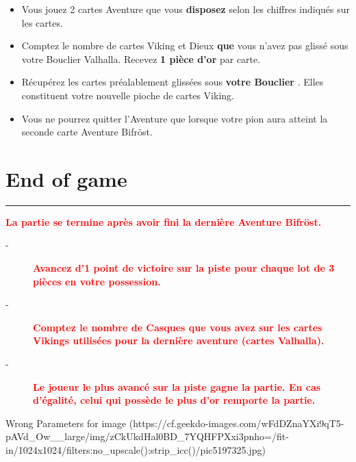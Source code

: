\documentclass{scrartcl}%
\begin{document}
\begin{itemize}%
\item%
%
 Vous jouez 2 cartes Aventure que vous %
\textcolor{mygreen}{%
\textbf{disposez}%
}%
\textit{ }%
 selon les chiffres indiqués sur les cartes.
%
\item%
%
 Comptez le nombre de cartes Viking et Dieux %
\textcolor{mygreen}{%
\textbf{que}%
}%
\textit{ }%
 vous n'avez pas glissé sous votre Bouclier Valhalla. Recevez %
\textcolor{mygreen}{%
\textbf{1 pièce d'or}%
}%
\textit{ }%
 par carte.
%
\item%
%
 Récupérez les cartes préalablement glissées sous %
\textcolor{mygreen}{%
\textbf{votre Bouclier}%
}%
. Elles constituent votre nouvelle pioche de cartes Viking.
%
\item%
%
 Vous ne pourrez quitter l'Aventure que lorsque votre pion aura atteint la seconde carte Aventure Bifröst.
%
\end{itemize}

%
\sectionfont{\color{red}}%
\subsectionfont{\color{red}}%
\subsubsectionfont{\color{red}}%
\section{ End of game
}%
\label{sec:Endofgame}%
\textcolor{red}{\rule{18cm}{0.07cm}}\break%
\textcolor{red}{%
\textbf{La partie se termine après avoir fini la dernière Aventure Bifröst.}%
}%

%
\begin{description}%
\item[{-} ]%
%
\textcolor{red}{%
\textbf{Avancez d'1 point de victoire sur la piste pour chaque lot de 3 pièces en votre possession.}%
}%

%
\item[{-} ]%
%
\textcolor{red}{%
\textbf{Comptez le nombre de Casques que vous avez sur les cartes Vikings utilisées pour la dernière aventure (cartes Valhalla).}%
}%

%
\item[{-} ]%
%
\textcolor{red}{%
\textbf{Le joueur le plus avancé sur la piste gagne la partie. En cas d'égalité, celui qui possède le plus d'or remporte la partie.}%
}%

%
\end{description}%
%
Wrong Parameters for image%
(https://cf.geekdo{-}images.com/wFdDZnaYXi9qT5{-}pAVd\_Ow\_\_large/img/zCkUkdHal0BD\_7YQHFPXxi3pnho=/fit{-}in/1024x1024/filters:no\_upscale():strip\_icc()/pic5197325.jpg)

%
\end{document}

